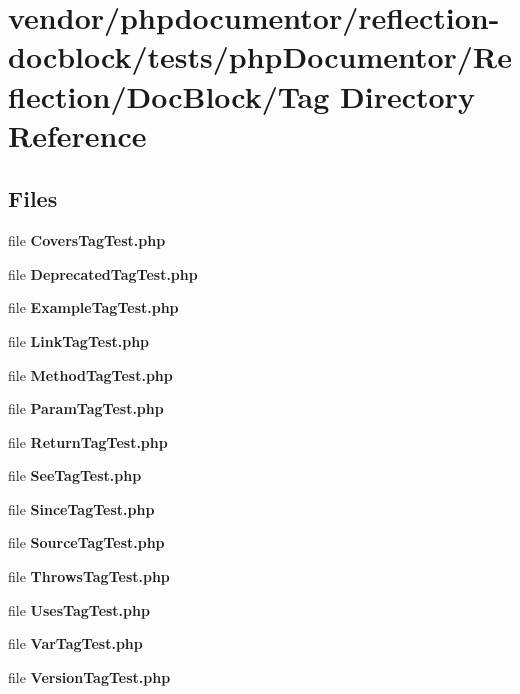 \section{vendor/phpdocumentor/reflection-\/docblock/tests/php\+Documentor/\+Reflection/\+Doc\+Block/\+Tag Directory Reference}
\label{dir_136ae2b12c98955f3624d42187a46025}
\subsection*{Files}
\begin{DoxyCompactItemize}
\item 
file {\bf Covers\+Tag\+Test.\+php}
\item 
file {\bf Deprecated\+Tag\+Test.\+php}
\item 
file {\bf Example\+Tag\+Test.\+php}
\item 
file {\bf Link\+Tag\+Test.\+php}
\item 
file {\bf Method\+Tag\+Test.\+php}
\item 
file {\bf Param\+Tag\+Test.\+php}
\item 
file {\bf Return\+Tag\+Test.\+php}
\item 
file {\bf See\+Tag\+Test.\+php}
\item 
file {\bf Since\+Tag\+Test.\+php}
\item 
file {\bf Source\+Tag\+Test.\+php}
\item 
file {\bf Throws\+Tag\+Test.\+php}
\item 
file {\bf Uses\+Tag\+Test.\+php}
\item 
file {\bf Var\+Tag\+Test.\+php}
\item 
file {\bf Version\+Tag\+Test.\+php}
\end{DoxyCompactItemize}
